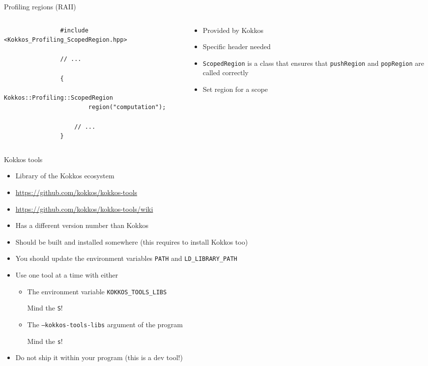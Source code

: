 \documentclass[
    aspectratio=169,
]{beamer}
\begin{document}
\begin{frame}[fragile]{Profiling regions (RAII)}
    \begin{columns}
        \begin{column}{0.65\linewidth}
            \begin{verbatim}
                #include <Kokkos_Profiling_ScopedRegion.hpp>

                // ...

                {
                    Kokkos::Profiling::ScopedRegion
                        region("computation");

                    // ...
                }
            \end{verbatim}
        \end{column}
        \begin{column}{0.35\linewidth}
            \begin{itemize}
                \item Provided by Kokkos
                \item Specific header needed
                \item \texttt{ScopedRegion} is a class that ensures that \texttt{pushRegion} and \texttt{popRegion} are called correctly
                \item Set region for a scope
            \end{itemize}
        \end{column}
    \end{columns}
\end{frame}

\begin{frame}{Kokkos tools}
    \begin{itemize}
        \item Library of the Kokkos ecosystem
        \item \url{https://github.com/kokkos/kokkos-tools}
        \item \url{https://github.com/kokkos/kokkos-tools/wiki}
        \item Has a different version number than Kokkos
        \item Should be built and installed somewhere (this requires to install Kokkos too)
        \item You should update the environment variables \texttt{PATH} and \texttt{LD\_LIBRARY\_PATH}
        \item Use one tool at a time with either
        \begin{itemize}
            \item The environment variable \texttt{KOKKOS\_TOOLS\_LIBS}

            Mind the \texttt{S}!
            \item The \texttt{--kokkos-tools-libs} argument of the program

            Mind the \texttt{s}!
        \end{itemize}
        \item Do not ship it within your program (this is a dev tool!)
    \end{itemize}
\end{frame}
\end{document}
